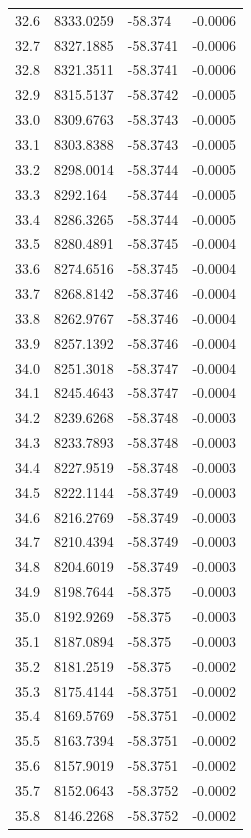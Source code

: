 \begin{table}[H]
\begin{tabular}{llll}
32.6 & 8333.0259 & -58.374 & -0.0006 \\
32.7 & 8327.1885 & -58.3741 & -0.0006 \\
32.8 & 8321.3511 & -58.3741 & -0.0006 \\
32.9 & 8315.5137 & -58.3742 & -0.0005 \\
33.0 & 8309.6763 & -58.3743 & -0.0005 \\
33.1 & 8303.8388 & -58.3743 & -0.0005 \\
33.2 & 8298.0014 & -58.3744 & -0.0005 \\
33.3 & 8292.164 & -58.3744 & -0.0005 \\
33.4 & 8286.3265 & -58.3744 & -0.0005 \\
33.5 & 8280.4891 & -58.3745 & -0.0004 \\
33.6 & 8274.6516 & -58.3745 & -0.0004 \\
33.7 & 8268.8142 & -58.3746 & -0.0004 \\
33.8 & 8262.9767 & -58.3746 & -0.0004 \\
33.9 & 8257.1392 & -58.3746 & -0.0004 \\
34.0 & 8251.3018 & -58.3747 & -0.0004 \\
34.1 & 8245.4643 & -58.3747 & -0.0004 \\
34.2 & 8239.6268 & -58.3748 & -0.0003 \\
34.3 & 8233.7893 & -58.3748 & -0.0003 \\
34.4 & 8227.9519 & -58.3748 & -0.0003 \\
34.5 & 8222.1144 & -58.3749 & -0.0003 \\
34.6 & 8216.2769 & -58.3749 & -0.0003 \\
34.7 & 8210.4394 & -58.3749 & -0.0003 \\
34.8 & 8204.6019 & -58.3749 & -0.0003 \\
34.9 & 8198.7644 & -58.375 & -0.0003 \\
35.0 & 8192.9269 & -58.375 & -0.0003 \\
35.1 & 8187.0894 & -58.375 & -0.0003 \\
35.2 & 8181.2519 & -58.375 & -0.0002 \\
35.3 & 8175.4144 & -58.3751 & -0.0002 \\
35.4 & 8169.5769 & -58.3751 & -0.0002 \\
35.5 & 8163.7394 & -58.3751 & -0.0002 \\
35.6 & 8157.9019 & -58.3751 & -0.0002 \\
35.7 & 8152.0643 & -58.3752 & -0.0002 \\
35.8 & 8146.2268 & -58.3752 & -0.0002 \\

\end{tabular}
\end{table}
